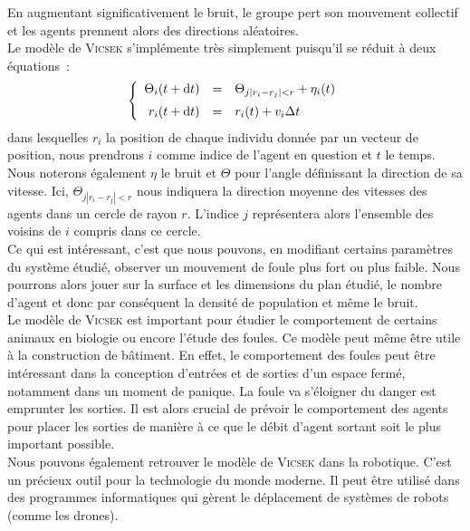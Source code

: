\documentclass[french, a4paper, 12pt, openany]{report}
\begin{document}
	En augmentant significativement le bruit, le groupe pert son mouvement collectif et les agents prennent alors des directions aléatoires.\\

	Le modèle de \textsc{Vicsek} s'implémente très simplement puisqu'il se réduit à deux équations~: \label{equations} 
	\[ \left\{ \begin{array}{rcl}
		\Theta_{i}(t + \text dt) & = & \Theta_{j |r_{i}-r_{j}|<r} + \eta_{i}(t) \\[0.2cm]
		r_{i}(t + \text dt) & = & r_{i}(t) + v_{i}\Delta t
	\end{array} \right. \]
	dans lesquelles $r_{i}$ la position de chaque individu donnée par un vecteur de position, nous prendrons $i$ comme indice de l'agent en question et $t$ le temps. Nous noterons également $\eta$ le bruit et $\Theta$ pour l’angle définissant la direction de sa vitesse. Ici, $\Theta_{j |r_{i}-r_{j}|<r}$ nous indiquera la direction moyenne des vitesses des agents dans un cercle de rayon $r$. L'indice $j$ représentera alors l'ensemble des voisins de $i$ compris dans ce cercle.\\

	Ce qui est intéressant, c'est que nous pouvons, en modifiant certains paramètres du système étudié, observer un mouvement de foule plus fort ou plus faible. Nous pourrons alors jouer sur la surface et les dimensions du plan étudié, le nombre d'agent et donc par conséquent la densité de population et même le bruit.\\

	Le modèle de \textsc{Vicsek} est important pour étudier le comportement de certains animaux en biologie ou encore l'étude des foules. Ce modèle peut même être utile à la construction de bâtiment. En effet, le comportement des foules peut être intéressant dans la conception d'entrées et de sorties d'un espace fermé, notamment dans un moment de panique. La foule va s'éloigner du danger est emprunter les sorties. Il est alors crucial de prévoir le comportement des agents pour placer les sorties de manière à ce que le débit d'agent sortant soit le plus important possible.\\
	
	Nous pouvons également retrouver le modèle de \textsc{Vicsek} dans la robotique. C'est un précieux outil pour la technologie du monde moderne. Il peut être utilisé dans des programmes informatiques qui gèrent le déplacement de systèmes de robots (comme les drones).\\ 
\end{document}
